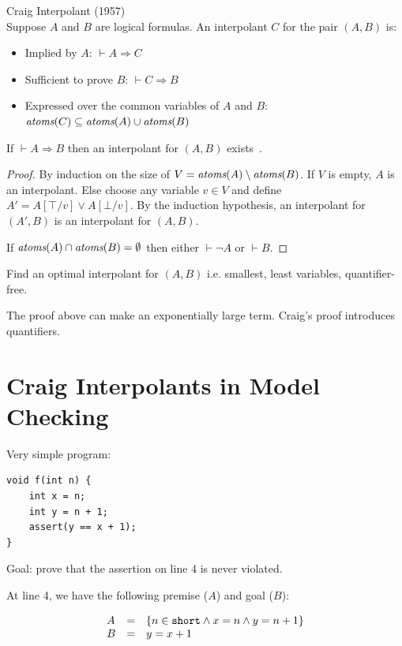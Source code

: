 \documentclass{article}
\begin{document}
\begin{defn}
  Craig Interpolant (1957) \\
  Suppose $A$ and $B$ are logical formulas.
  An interpolant $C$ for the pair $(A, B)$ is:
  \begin{itemize}
  \item Implied by $A$: $\vdash A \Rightarrow C$
  \item Sufficient to prove $B$: $\vdash C \Rightarrow B$
  \item Expressed over the common variables of $A$ and $B$:
  \subitem $\emph{atoms}(C) \subseteq \emph{atoms}(A) \cup \emph{atoms}(B)$
  \end{itemize}
\end{defn}
\begin{theorem}
  If $\vdash A \Rightarrow B$ then an interpolant for $(A, B)$ exists~\cite{c-jsl-1957}.
\end{theorem}
\begin{proof}
  By induction on the size of $V = \emph{atoms}(A) \setminus \emph{atoms}(B)$.
  If $V$ is empty, $A$ is an interpolant.
  Else choose any variable $v \in V$ and define $A' = A[\top/v] \vee A[\bot/v]$.
  By the induction hypothesis, an interpolant for $(A', B)$ is an interpolant for $(A, B)$.

  If $\emph{atoms}(A) \cap \emph{atoms}(B) = \emptyset$ then either $\vdash \neg A$ or $\vdash B$.
\end{proof}

\begin{challenge}
Find an optimal interpolant for $(A, B)$ i.e. smallest, least variables, quantifier-free.
\end{challenge}
The proof above can make an exponentially large term.
Craig's proof introduces quantifiers.


\section{Craig Interpolants in Model Checking}

Very simple program:
\begin{lstlisting}
void f(int n) {
    int x = n;
    int y = n + 1;
    assert(y == x + 1);
}
\end{lstlisting}

Goal: prove that the assertion on line 4 is never violated.

At line 4, we have the following premise ($A$) and goal ($B$):

$$\begin{array}{l l l}
  A & = & \{n \in {\tt short} \wedge x = n \wedge y = n + 1 \}
\\B & = & y = x + 1
\end{array}$$
\end{document}
